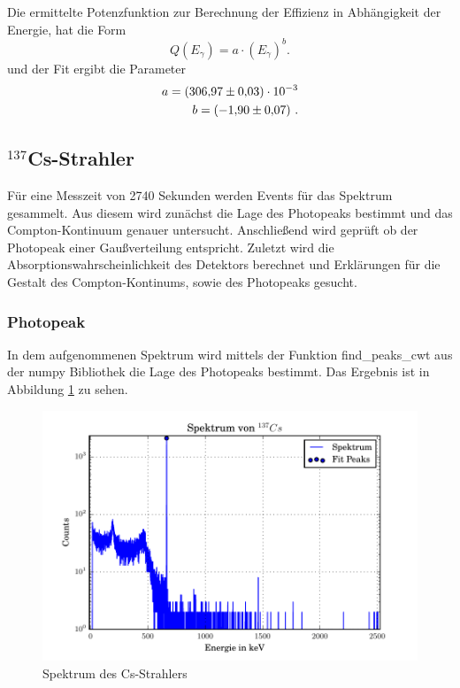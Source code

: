 Die ermittelte Potenzfunktion zur Berechnung der Effizienz in Abhängigkeit der Energie, hat die Form
\begin{equation}
  Q(E_\gamma)=  a \cdot \left( E_\gamma \right)^{b} .
  \label{eqn:QCs}
\end{equation}
und der Fit ergibt die Parameter
\begin{eqnarray}
  a = (\num{306,97 +- 0,03}) \cdot 10^{-3} \\
  b = (\num{-1,90 +- 0,07}) \ .
\end{eqnarray}

\subsection{$^{137}$Cs-Strahler}
Für eine Messzeit von 2740 Sekunden werden Events für das Spektrum gesammelt. Aus diesem wird zunächst die Lage des Photopeaks bestimmt und das Compton-Kontinuum genauer untersucht. Anschließend wird geprüft ob der Photopeak einer Gaußverteilung entspricht. Zuletzt wird die Absorptionswahrscheinlichkeit des Detektors berechnet und Erklärungen für die Gestalt des Compton-Kontinums, sowie des Photopeaks gesucht.


\subsubsection{Photopeak}
In dem aufgenommenen Spektrum wird mittels der Funktion find\_peaks\_cwt aus der numpy Bibliothek die Lage des Photopeaks bestimmt. Das Ergebnis ist in Abbildung \ref{fig:SpekCS} zu sehen.
\begin{figure}
  \centering
  \includegraphics[width=\textwidth]{./build/SpektCS.pdf}
  \caption{Spektrum des Cs-Strahlers}
  \label{fig:SpekCS}
\end{figure}

